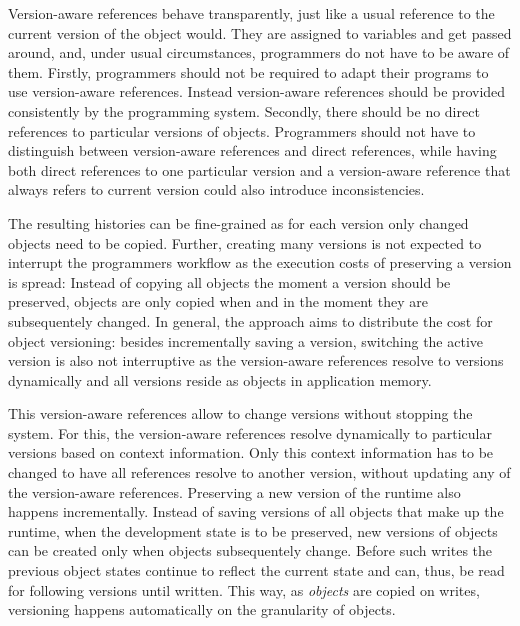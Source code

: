 Version-aware references behave transparently, just like a usual reference to the current version of the object would.
They are assigned to variables and get passed around, and, under usual circumstances, programmers do not have to be aware of them.
Firstly, programmers should not be required to adapt their programs to use version-aware references.
Instead version-aware references should be provided consistently by the programming system.
Secondly, there should be no direct references to particular versions of objects.
Programmers should not have to distinguish between version-aware references and direct references, while having both direct references to one particular version and a version-aware reference that always refers to current version could also introduce inconsistencies.



The resulting histories can be fine-grained as for each version only changed objects need to be copied.
Further, creating many versions is not expected to interrupt the programmers workflow as the execution costs of preserving a version is spread: Instead of copying all objects the moment a version should be preserved, objects are only copied when and in the moment they are subsequentely changed.
In general, the approach aims to distribute the cost for object versioning: besides incrementally saving a version, switching the active version is also not interruptive as the version-aware references resolve to versions dynamically and all versions reside as objects in application memory.


This version-aware references allow to change versions without stopping the system.
For this, the version-aware references resolve dynamically to particular versions based on context information.
Only this context information has to be changed to have all references resolve to another version, without updating any of the version-aware references.
Preserving a new version of the runtime also happens incrementally.
Instead of saving versions of all objects that make up the runtime, when the development state is to be preserved, new versions of objects can be created only when objects subsequentely change.
Before such writes the previous object states continue to reflect the current state and can, thus, be read for following versions until written.
This way, as \emph{objects} are copied on writes, versioning happens automatically on the granularity of objects.







